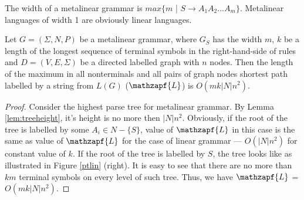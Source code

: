 The width of a metalinear grammar is $max\{m$ | $S \rightarrow A_1A_2...A_m \}$. Metalinear languages of width 1 are obviously linear languages.
\begin{lemma}
\label{thmetalin}
Let  $G = (\Sigma, N, P)$ be a metalinear grammar, where $G_S$ has the width $m$, $k$ be a length of the longest sequence of terminal symbols in the right-hand-side of rules and $D=(V, E, \Sigma)$ be a directed labelled graph with $n$ nodes. Then the length of the maximum in all nonterminals and all pairs of graph nodes shortest path labelled by a string from $L(G)$ ($\mathzapf{L}$) is $O(mk|N|n^2)$.
\end{lemma}
\begin{proof}
Consider the highest parse tree for metalinear grammar. By Lemma \ref{lem:treeheight}, it's height is no more then $|N|n^2$. Obviously, if the root of the tree is labelled by some $A_i  \in N - \{S\}$, value of $\mathzapf{L}$ in this case is the same as value of $\mathzapf{L}$ for the case of linear grammar --- $O(|N|n^2)$ for constant value of $k$. If the root of the tree is labelled by $S$, the tree looks like as illustrated in Figure \ref{ptlin} (right). It is easy to see that there are no more than $km$ terminal symbols on every level of such tree. Thus, we have $\mathzapf{L}$ = $O(mk|N|n^2)$. 
\end{proof}
